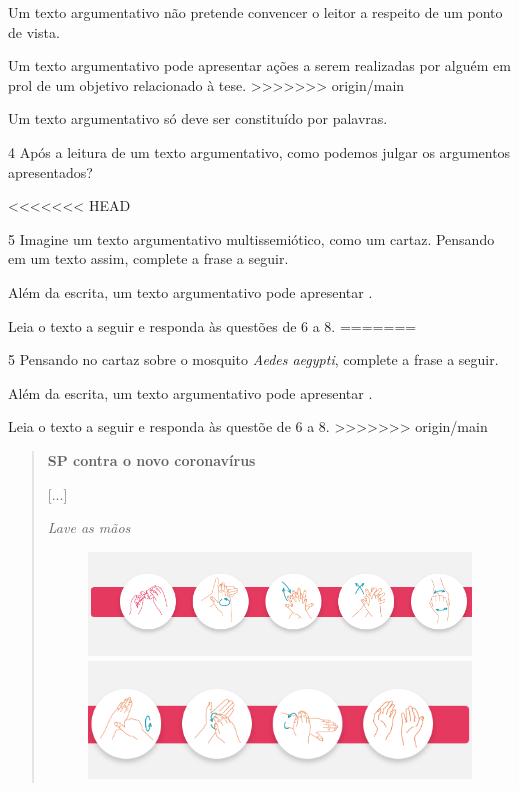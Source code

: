 {\begin{boxlist}
 Um texto argumentativo não pretende convencer o leitor a respeito de
um ponto de vista.

 Um texto argumentativo pode apresentar ações a serem realizadas por alguém em prol de um objetivo relacionado à tese.
>>>>>>> origin/main

 Um texto argumentativo só deve ser constituído por palavras.
\end{boxlist}

\num{4} Após a leitura de um texto argumentativo, como podemos julgar os argumentos apresentados?


<<<<<<< HEAD

\num{5} Imagine um texto argumentativo multissemiótico, como um cartaz. Pensando em um texto assim, complete a frase a seguir.

Além da escrita, um texto argumentativo pode apresentar \preencher. 

Leia o texto a seguir e responda às questões de 6 a 8.
=======

\num{5} Pensando no cartaz sobre o mosquito \textit{Aedes aegypti}, complete a frase a seguir.

\bigskip

\noindent{}Além da escrita, um texto argumentativo pode apresentar .

\bigskip

Leia o texto a seguir e responda às questõe de 6 a 8.
>>>>>>> origin/main

\begin{quote}
\textbf{SP contra o novo coronavírus}

{[}...{]}

\textit{Lave as mãos}

\begin{figure}[htpb!]
\includegraphics[width=.5\textwidth]{./imgs/img12.png}
\includegraphics[width=.5\textwidth]{./imgs/img13.png}
\end{figure}


\end{quote}}
